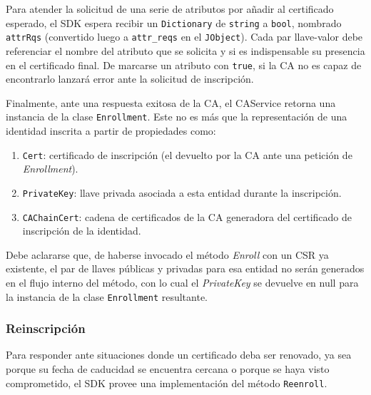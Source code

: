 
Para atender la solicitud de una serie de atributos por a\~nadir al certificado esperado, el SDK espera recibir un \texttt{Dictionary} de \texttt{string} a \texttt{bool}, nombrado \texttt{attrRqs} (convertido luego a \texttt{attr\_reqs} en el \texttt{JObject}). Cada par llave-valor debe referenciar el nombre del atributo que se solicita y si es indispensable su presencia en el certificado final. De marcarse un atributo con \texttt{true}, si la CA no es capaz de encontrarlo lanzar\'a error ante la solicitud de inscripci\'on.

Finalmente, ante una respuesta exitosa de la CA, el CAService retorna una instancia de la clase \texttt{Enrollment}. Este no es m\'as que la representaci\'on de una identidad inscrita a partir de propiedades como:
\begin{enumerate}
	\item \texttt{Cert}: certificado de inscripci\'on (el devuelto por la CA ante una petici\'on de \emph{Enrollment}).
	
	\item \texttt{PrivateKey}: llave privada asociada a esta entidad durante la inscripci\'on.
	
	\item \texttt{CAChainCert}: cadena de certificados de la CA generadora del certificado de inscripci\'on de la identidad.
\end{enumerate} 

Debe aclararse que, de haberse invocado el m\'etodo \emph{Enroll} con un CSR ya existente, el par de llaves p\'ublicas y privadas para esa entidad no ser\'an generados en el flujo interno del m\'etodo, con lo cual el \emph{PrivateKey} se devuelve en null para la instancia de la clase \texttt{Enrollment} resultante.

\subsubsection{Reinscripci\'on}

Para responder ante situaciones donde un certificado deba ser renovado, ya sea porque su fecha de caducidad se encuentra cercana o porque se haya visto comprometido, el SDK provee una implementaci\'on del m\'etodo \texttt{Reenroll}.

